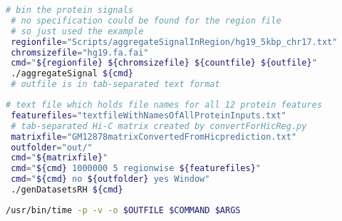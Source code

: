\begin{appendices}
\begin{lstlisting}[language=bash,caption=preparing inputs for HiC-Reg  (example),label=methods:list:hicregInputs]
 # bin the protein signals
 # no specification could be found for the region file
 # so just used the example
 regionfile="Scripts/aggregateSignalInRegion/hg19_5kbp_chr17.txt"
 chromsizefile="hg19.fa.fai"
 cmd="${regionfile} ${chromsizefile} ${countfile} ${outfile}"
 ./aggregateSignal ${cmd}
 # outfile is in tab-separated text format
\end{lstlisting}

\begin{lstlisting}[language=bash,caption=computing window features for HiC-Reg (example),label=methods:list:hicregWindow]
 # text file which holds file names for all 12 protein features
 featurefiles="textfileWithNamesOfAllProteinInputs.txt"
 # tab-separated Hi-C matrix created by convertForHicReg.py
 matrixfile="GM12878matrixConvertedFromHicprediction.txt"
 outfolder="out/"
 cmd="${matrixfile}"
 cmd="${cmd} 1000000 5 regionwise ${featurefiles}"
 cmd="${cmd} no ${outfolder} yes Window"
 ./genDatasetsRH ${cmd}
\end{lstlisting}

\begin{lstlisting}[language=bash,caption=measuring ressource consumption,label=methods:list:usrbintime]
 /usr/bin/time -p -v -o $OUTFILE $COMMAND $ARGS
\end{lstlisting}

\end{appendices}